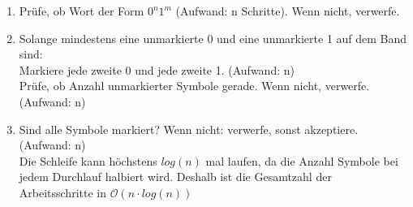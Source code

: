 \begin{enumerate}
\item Prüfe, ob Wort der Form $0^n 1^m$ (Aufwand: n Schritte). Wenn nicht, verwerfe.
\item Solange mindestens eine unmarkierte 0 und eine unmarkierte 1 auf dem Band sind:\\
	Markiere jede zweite 0 und jede zweite 1. (Aufwand: n)\\
	Prüfe, ob Anzahl unmarkierter Symbole gerade. Wenn nicht, verwerfe. (Aufwand: n)
\item Sind alle Symbole markiert? Wenn nicht: verwerfe, sonst akzeptiere. (Aufwand: n)\\
	Die Schleife kann höchstens $log(n)$ mal laufen, da die Anzahl Symbole bei jedem Durchlauf halbiert wird.
	Deshalb ist die Gesamtzahl der Arbeitsschritte in $\mathcal{O}(n \cdot log(n))$
\end{enumerate}
